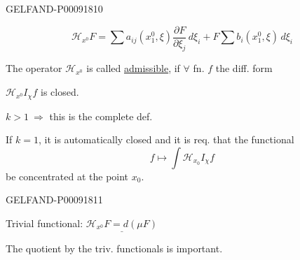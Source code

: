 \begin{GelfandAdjacentEvidence}{GELFAND-P000918}{10}


\begin{equation*}
 \mathcal H_{x^0}F=
 \sum a_{ij}(x_1^0,\xi)\frac{\partial F}{\partial\xi_j}\,d\xi_i
 + F\sum b_i(x_1^0,\xi)\,d\xi_i
\end{equation*}

The operator $\mathcal H_{x^0}$ is called \uline{admissible}, if $\forall$ fn. $f$ the diff. form

\(\mathcal H_{x^0}I_\chi f\) is closed.

\(k>1\ \Rightarrow\) this is the complete def.

If $k=1$, it is automatically closed and it is req. that the functional
\begin{equation*}
 f\mapsto\int\mathcal H_{x_0}I_\chi f
\end{equation*}
be concentrated at the point \(x_0\).
\end{GelfandAdjacentEvidence}
\begin{GelfandAdjacentEvidence}{GELFAND-P000918}{11}


Trivial functional: \(\underline{\mathcal H_{x^0}F=d(\mu F)}\)
\end{GelfandAdjacentEvidence}


The quotient by the triv. functionals is important.


\clearpage
{}
